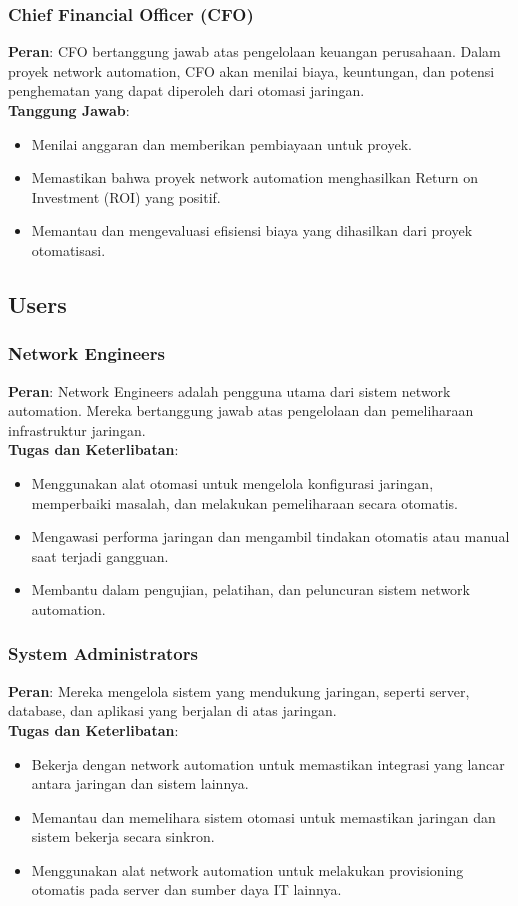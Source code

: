\subsubsection{Chief Financial Officer (CFO)}
\textbf{Peran}: CFO bertanggung jawab atas pengelolaan keuangan perusahaan. Dalam proyek network automation, CFO akan menilai biaya, keuntungan, dan potensi penghematan yang dapat diperoleh dari otomasi jaringan. \\
\textbf{Tanggung Jawab}:
\begin{itemize}
    \item Menilai anggaran dan memberikan pembiayaan untuk proyek.
    \item Memastikan bahwa proyek network automation menghasilkan Return on Investment (ROI) yang positif.
    \item Memantau dan mengevaluasi efisiensi biaya yang dihasilkan dari proyek otomatisasi.
\end{itemize}

\subsection{Users}

\subsubsection{Network Engineers}
\textbf{Peran}: Network Engineers adalah pengguna utama dari sistem network automation. Mereka bertanggung jawab atas pengelolaan dan pemeliharaan infrastruktur jaringan. \\
\textbf{Tugas dan Keterlibatan}:
\begin{itemize}
    \item Menggunakan alat otomasi untuk mengelola konfigurasi jaringan, memperbaiki masalah, dan melakukan pemeliharaan secara otomatis.
    \item Mengawasi performa jaringan dan mengambil tindakan otomatis atau manual saat terjadi gangguan.
    \item Membantu dalam pengujian, pelatihan, dan peluncuran sistem network automation.
\end{itemize}

\subsubsection{System Administrators}
\textbf{Peran}: Mereka mengelola sistem yang mendukung jaringan, seperti server, database, dan aplikasi yang berjalan di atas jaringan. \\
\textbf{Tugas dan Keterlibatan}:
\begin{itemize}
    \item Bekerja dengan network automation untuk memastikan integrasi yang lancar antara jaringan dan sistem lainnya.
    \item Memantau dan memelihara sistem otomasi untuk memastikan jaringan dan sistem bekerja secara sinkron.
    \item Menggunakan alat network automation untuk melakukan provisioning otomatis pada server dan sumber daya IT lainnya.
\end{itemize}


